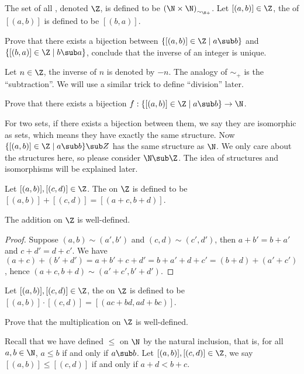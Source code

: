 \documentclass[10pt]{article}
\begin{document}
\begin{definition}
    The set of all , denoted $\Z$, is defined to be ${(\N\times{\N})}_{{\sim}_{\N+}}$. Let $[(a,b)]\in\Z$, the  of $[(a,b)]$ is defined to be $[(b,a)]$.
\end{definition}
\begin{problem}
    Prove that there exists a bijection between $\{[(a,b)]\in\Z\mid a\sub b\}$ and $\{[(b,a)]\in\Z\mid b\sub a\}$, conclude that the inverse of an integer is unique.
\end{problem}
\par
Let $n\in\Z$, the inverse of $n$ is denoted by $-n$. The analogy of ${\sim}_{+}$ is  the ``subtraction''. We will use a similar trick to define ``division'' later.
\begin{problem}
    Prove that there exists a bijection $f:\{[(a,b)]\in\Z\mid a\sub b\}\to\N$.
\end{problem}
\par
For two sets, if there exists a bijection between them, we say they are isomorphic as sets, which means they have exactly the same structure. Now $\{[(a,b)]\in\Z\mid a\sub b\}\sub Z$ has the same structure as $\N$. We only care about the structures here, so please consider $\N\sub\Z$. The idea of structures and isomorphisms will be explained later.
\begin{definition}
    Let $[(a,b)],[(c,d)]\in\Z$. The  on $\Z$ is defined to be $[(a,b)]+[(c,d)]=[(a+c,b+d)]$.
\end{definition}
\begin{proposition}
    The addition on $\Z$ is well-defined.
\end{proposition}
\begin{proof}
    Suppose $(a,b)\sim(a',b')$ and $(c,d)\sim(c',d')$, then $a+b'=b+a'$ and $c+d'=d+c'$. We have $(a+c)+(b'+d')=a+b'+c+d'=b+a'+d+c'=(b+d)+(a'+c')$, hence $(a+c,b+d)\sim(a'+c',b'+d')$.
\end{proof}
\begin{definition}
    Let $[(a,b)],[(c,d)]\in\Z$, the  on $\Z$ is defined to be $[(a,b)]\cdot[(c,d)]=[(ac+bd,ad+bc)]$.
\end{definition}
\begin{problem}
    Prove that the multiplication on $\Z$ is well-defined.
\end{problem}
\par
Recall that we have defined $\le$ on $\N$ by the natural inclusion, that is, for all $a,b\in\N$, $a\le b$ if and only if $a\sub b$. Let $[(a,b)],[(c,d)]\in\Z$, we say $[(a,b)]\le[(c,d)]$ if and only if $a+d<b+c$.
\end{document}
